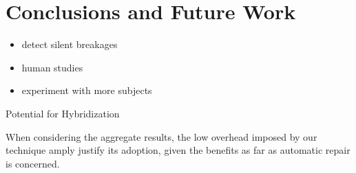 \section{Conclusions and Future Work}\label{sec:conclusions}

\begin{itemize}
\item detect silent breakages
\item human studies
\item experiment with more subjects
\end{itemize}

Potential for Hybridization


When considering the aggregate results, the low overhead imposed by our technique amply justify its adoption, given the benefits as far as automatic repair is concerned.  

